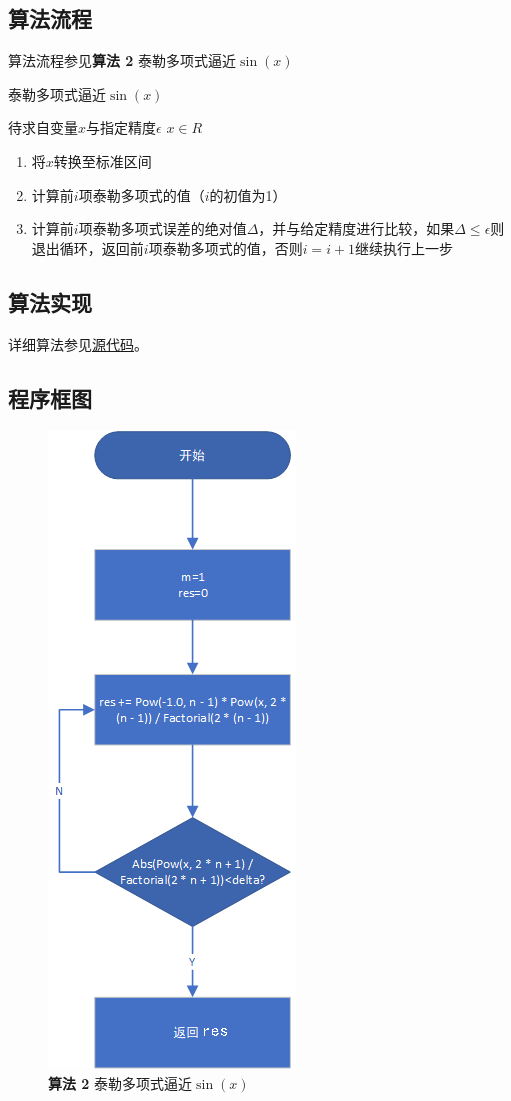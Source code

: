 \documentclass[lang=cn,11pt,a4paper]{elegantpaper}
\begin{document}
\subsection{算法流程}
算法流程参见\textbf{算法 2} 泰勒多项式逼近$\sin(x)$
\begin{algorithm}
  \caption{泰勒多项式逼近$\sin(x)$}
  \begin{algorithmic}
    \Require 待求自变量$x$与指定精度$\epsilon$
    \Ensure $x\in R$
    \begin{enumerate}
      \item 将$x$转换至标准区间
      \item 计算前$i$项泰勒多项式的值（$i$的初值为1）
      \item 计算前$i$项泰勒多项式误差的绝对值$\Delta$，并与给定精度进行比较，如果$\Delta \leq \epsilon$则退出循环，返回前$i$项泰勒多项式的值，否则$i=i+1$继续执行上一步
    \end{enumerate}
  \end{algorithmic}
\end{algorithm}
\subsection{算法实现}
详细算法参见\href{https://github.com/Antonio-Chan/SineCalculate}{源代码}。
\subsection{程序框图}
\begin{figure}[htbp]
    \centering
    \includegraphics[width=0.32\linewidth]{src/B.png}
    \centering
    \caption{\textbf{算法 2} 泰勒多项式逼近$\sin(x)$}
\end{figure}
\end{document}

